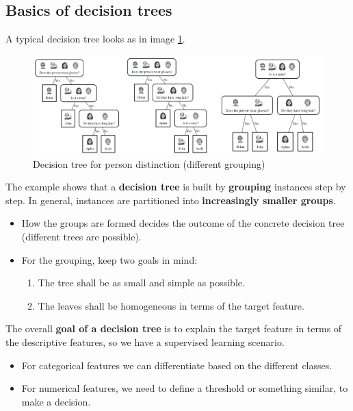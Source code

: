 \subsection{Basics of decision trees}

A typical decision tree looks as in image \ref{fig:3_tree_example}.

\begin{figure}[h]
  \centering
  \includegraphics[width=\textwidth]{assets/trees/basics/tree_example_people.png}
  \caption{Decision tree for person distinction (different grouping)}
  \label{fig:3_tree_example}
\end{figure}

The example shows that a \textbf{decision tree} is built by \textbf{grouping} instances step by step. In general, instances are partitioned into \textbf{increasingly smaller groups}. 
\begin{itemize}
  \item How the groups are formed decides the outcome of the concrete decision tree (different trees are possible).
  \item For the grouping, keep two goals in mind:
  \begin{enumerate}
    \item The tree shall be as small and simple as possible.
    \item The leaves shall be homogeneous in terms of the target feature.
  \end{enumerate}
\end{itemize}

The overall \textbf{goal of a decision tree} is to explain the target feature in terms of the descriptive features, so we have a supervised learning scenario.
\begin{itemize}
  \item For categorical features we can differentiate based on the different classes.
  \item For numerical features, we need to define a threshold or something similar, to make a decision.
\end{itemize}

